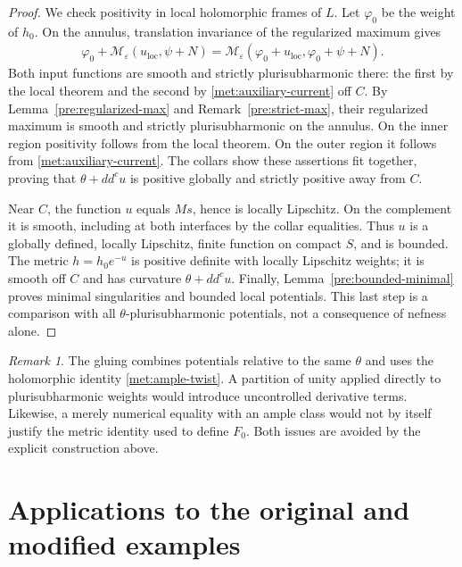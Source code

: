 \documentclass[11pt,a4paper]{article}
\numberwithin{equation}{section}
\theoremstyle{definition}
\theoremstyle{remark}
\newtheorem{remark}[theorem]{Remark}
\newcommand{\ddc}{dd^{c}}
\begin{document}
\begin{proof}
We check positivity in local holomorphic frames of $L$. Let
$\varphi_0$ be the weight of $h_0$. On the annulus, translation
invariance of the regularized maximum gives
\begin{align*}
 \varphi_0+
 \mathcal M_\varepsilon(u_{\mathrm{loc}},\psi+N)
 =\mathcal M_\varepsilon
        (\varphi_0+u_{\mathrm{loc}},\varphi_0+\psi+N).
\end{align*}
Both input functions are smooth and strictly plurisubharmonic there:
the first by the local theorem and the second by
\eqref{met:auxiliary-current} off $C$. By
Lemma~\ref{pre:regularized-max} and Remark~\ref{pre:strict-max}, their regularized maximum
is smooth and strictly plurisubharmonic on the annulus. On the inner
region positivity follows from the local theorem. On the outer
region it follows from \eqref{met:auxiliary-current}. The collars
show these assertions fit together, proving that
$\theta+\ddc u$ is positive globally and strictly positive away
from $C$.

Near $C$, the function $u$ equals $Ms$, hence is locally Lipschitz.
On the complement it is smooth, including at both interfaces by the
collar equalities. Thus $u$ is a globally defined, locally Lipschitz,
finite function on compact $S$, and is bounded. The metric
$h=h_0e^{-u}$ is positive definite with locally Lipschitz weights;
it is smooth off $C$ and has curvature $\theta+\ddc u$.
Finally, Lemma~\ref{pre:bounded-minimal} proves minimal singularities and
bounded local potentials. This last step is a comparison with all
$\theta$-plurisubharmonic potentials, not a consequence of nefness
alone.
\end{proof}

\begin{remark}\label{met:no-partition}
The gluing combines potentials relative to the same $\theta$ and uses
the holomorphic identity \eqref{met:ample-twist}. A partition of unity
applied directly to plurisubharmonic weights would introduce uncontrolled
derivative terms. Likewise, a merely numerical equality with an ample
class would not by itself justify the metric identity used to define
$F_0$. Both issues are avoided by the explicit construction above.
\end{remark}

\section{Applications to the original and modified examples}
\label{sec:consequences}
\end{document}
